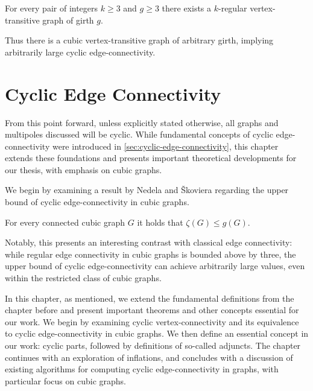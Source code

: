 \documentclass[12pt, twoside]{book}
\begin{document}
\begin{theorem}\label{th:vertex-transitive-girth-regular}
	For every pair of integers $k \geq 3$ and $g \geq 3$ there exists a $k$-regular vertex-transitive graph of girth $g$.
\end{theorem}

Thus there is a cubic vertex-transitive graph of arbitrary girth, implying arbitrarily large cyclic \mbox{edge-connectivity}.

\chapter{Cyclic Edge Connectivity}\label{ch:cyclic-edge-connectivity}

From this point forward, unless explicitly stated otherwise, all graphs and multipoles discussed will be cyclic. While fundamental concepts of cyclic edge-connectivity were introduced in \cref{sec:cyclic-edge-connectivity}, this chapter extends these foundations and presents important theoretical developments for our thesis, with emphasis on cubic graphs.

We begin by examining a result by Nedela and Škoviera regarding the upper bound of cyclic edge-connectivity in cubic graphs. 

\begin{proposition}\label{prop:cyclic-con-less-than-girth}
	For every connected cubic graph $G$ it holds that $\zeta(G)\leq g(G)$.
\end{proposition}

Notably, this presents an interesting contrast with classical edge connectivity: while regular edge connectivity in cubic graphs is bounded above by three, the upper bound of cyclic edge-connectivity can achieve arbitrarily large values, even within the restricted class of cubic graphs.

In this chapter, as mentioned, we extend the fundamental definitions from the chapter before and present important theorems and other concepts essential for our work. We begin by examining cyclic vertex-connectivity and its equivalence to cyclic edge-connectivity in cubic graphs. We then define an essential concept in our work: cyclic parts, followed by definitions of so-called adjuncts. The chapter continues with an exploration of inflations, and concludes with a discussion of existing algorithms for computing cyclic edge-connectivity in graphs, with particular focus on cubic graphs.
\end{document}
